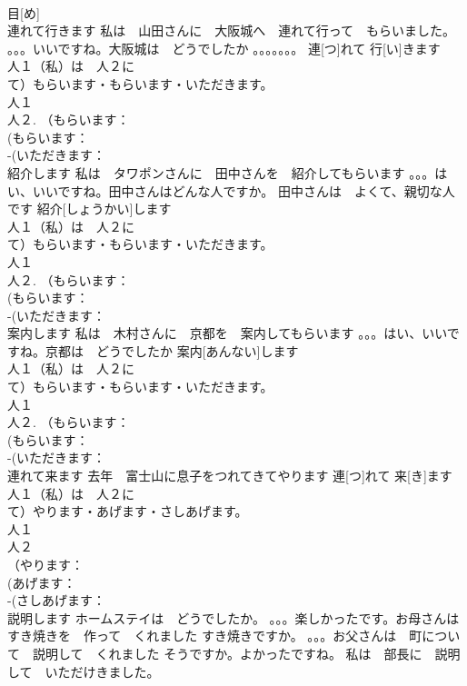 \documentclass[8pt]{extreport}
\begin{document}
\begin{CJK}{UTF8}{min}
\\	目[め]			
\\	連れて行きます	私は　山田さんに　大阪城へ　連れて行って　もらいました。 。。。いいですね。大阪城は　どうでしたか 。。。。。。。	連[つ]れて 行[い]きます			
\\	人１（私）は　人２に　
\\	て）もらいます・もらいます・いただきます。
\\	人１
\\	人２. （もらいます：
\\	(もらいます：
\\	-(いただきます：
\\	紹介します	私は　タワポンさんに　田中さんを　紹介してもらいます 。。。はい、いいですね。田中さんはどんな人ですか。 田中さんは　よくて、親切な人です	紹介[しょうかい]します			
\\	人１（私）は　人２に　
\\	て）もらいます・もらいます・いただきます。
\\	人１
\\	人２. （もらいます：
\\	(もらいます：
\\	-(いただきます：
\\	案内します	私は　木村さんに　京都を　案内してもらいます 。。。はい、いいですね。京都は　どうでしたか	案内[あんない]します			
\\	人１（私）は　人２に　
\\	て）もらいます・もらいます・いただきます。
\\	人１
\\	人２. （もらいます：
\\	(もらいます：
\\	-(いただきます：
\\	連れて来ます	去年　富士山に息子をつれてきてやります	連[つ]れて 来[き]ます			
\\	人１（私）は　人２に　
\\	て）やります・あげます・さしあげます。
\\	人１
\\	人２
\\	（やります：
\\	(あげます：
\\	-(さしあげます：
\\	説明します	ホームステイは　どうでしたか。 。。。楽しかったです。お母さんはすき焼きを　作って　くれました すき焼きですか。 。。。お父さんは　町について　説明して　くれました そうですか。よかったですね。 私は　部長に　説明して　いただけきました。 

\end{CJK}
\end{document}
